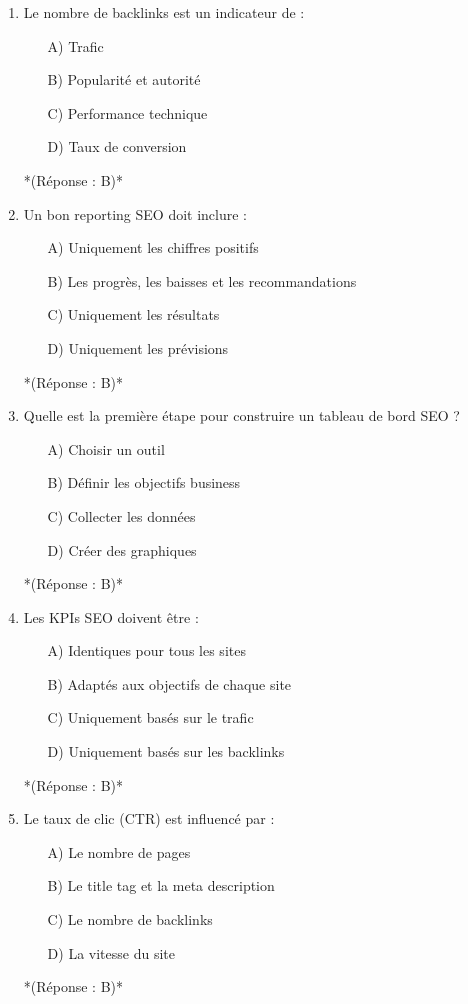 \documentclass[12pt,a4paper,twoside]{report}
\begin{document}
\begin{enumerate}
    \item Le nombre de backlinks est un indicateur de :
    \begin{itemize}
        \item[A)] Trafic
        \item[B)] Popularité et autorité
        \item[C)] Performance technique
        \item[D)] Taux de conversion
    \end{itemize}
    *(Réponse : B)*

    \item Un bon reporting SEO doit inclure :
    \begin{itemize}
        \item[A)] Uniquement les chiffres positifs
        \item[B)] Les progrès, les baisses et les recommandations
        \item[C)] Uniquement les résultats
        \item[D)] Uniquement les prévisions
    \end{itemize}
    *(Réponse : B)*

    \item Quelle est la première étape pour construire un tableau de bord SEO ?
    \begin{itemize}
        \item[A)] Choisir un outil
        \item[B)] Définir les objectifs business
        \item[C)] Collecter les données
        \item[D)] Créer des graphiques
    \end{itemize}
    *(Réponse : B)*

    \item Les KPIs SEO doivent être :
    \begin{itemize}
        \item[A)] Identiques pour tous les sites
        \item[B)] Adaptés aux objectifs de chaque site
        \item[C)] Uniquement basés sur le trafic
        \item[D)] Uniquement basés sur les backlinks
    \end{itemize}
    *(Réponse : B)*

    \item Le taux de clic (CTR) est influencé par :
    \begin{itemize}
        \item[A)] Le nombre de pages
        \item[B)] Le title tag et la meta description
        \item[C)] Le nombre de backlinks
        \item[D)] La vitesse du site
    \end{itemize}
    *(Réponse : B)*


\end{enumerate}
\end{document}
